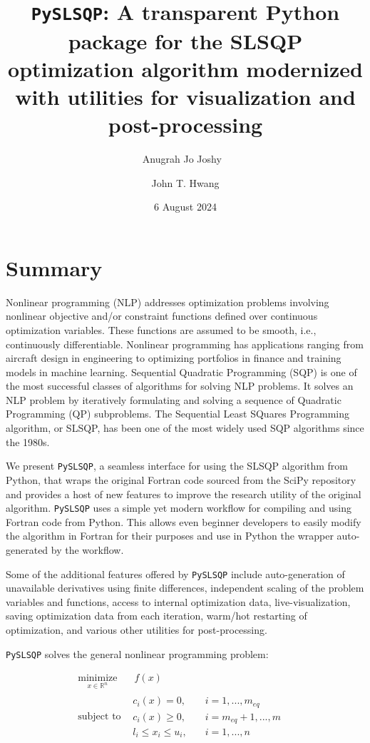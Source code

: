 \documentclass[
]{article}
\title{\texttt{PySLSQP}: A transparent Python package for the SLSQP
optimization algorithm modernized with utilities for visualization and
post-processing}
\author[1%
  ]{Anugrah Jo Joshy%
    \,\orcidlink{0009-0003-7704-2532}\,%
    }
\author[2%
  ]{John T. Hwang%
    }
\affil[1]{PhD Candidate, Department of Mechanical and Aerospace
Engineering, University of California San Diego}
\affil[2]{Associate Professor, Department of Mechanical and Aerospace
Engineering, University of California San Diego}
\date{6 August 2024}
\begin{document}
\maketitle

\section{Summary}\label{summary}

Nonlinear programming (NLP) addresses optimization problems involving
nonlinear objective and/or constraint functions defined over continuous
optimization variables. These functions are assumed to be smooth, i.e.,
continuously differentiable. Nonlinear programming has applications
ranging from aircraft design in engineering to optimizing portfolios in
finance and training models in machine learning. Sequential Quadratic
Programming (SQP) is one of the most successful classes of algorithms
for solving NLP problems. It solves an NLP problem by iteratively
formulating and solving a sequence of Quadratic Programming (QP)
subproblems. The Sequential Least SQuares Programming algorithm, or
SLSQP, has been one of the most widely used SQP algorithms since the
1980s.

We present \texttt{PySLSQP}, a seamless interface for using the SLSQP
algorithm from Python, that wraps the original Fortran code sourced from
the SciPy repository and provides a host of new features to improve the
research utility of the original algorithm. \texttt{PySLSQP} uses a
simple yet modern workflow for compiling and using Fortran code from
Python. This allows even beginner developers to easily modify the
algorithm in Fortran for their purposes and use in Python the wrapper
auto-generated by the workflow.

Some of the additional features offered by \texttt{PySLSQP} include
auto-generation of unavailable derivatives using finite differences,
independent scaling of the problem variables and functions, access to
internal optimization data, live-visualization, saving optimization data
from each iteration, warm/hot restarting of optimization, and various
other utilities for post-processing.

\texttt{PySLSQP} solves the general nonlinear programming problem:

\[
\begin{array}{rlr}
\underset{x \in \mathbb{R}^n}{\text{minimize}} & \; \; f(x) & \\
\text{subject to} & \begin{array}{ll}
                      c_i(x) = 0, &\quad i = 1,...,m_{eq} \\
                      c_i(x) \geq 0, &\quad i = m_{eq}+1,...,m \\
                      l_i \leq x_i \leq u_i, &\quad i = 1,...,n
                    \end{array}
\end{array}
\]
\end{document}
